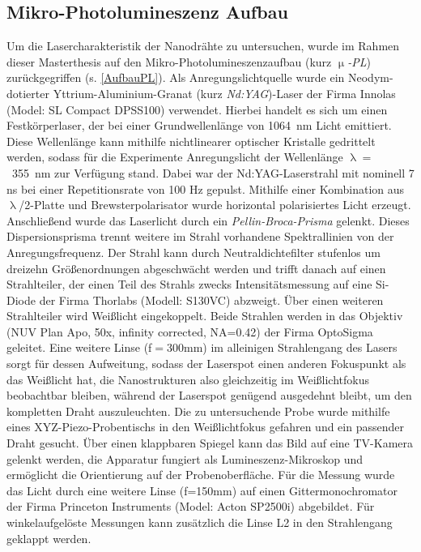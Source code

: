 \subsection{Mikro-Photolumineszenz Aufbau} Um die Lasercharakteristik der
Nanodrähte zu untersuchen, wurde im Rahmen dieser Masterthesis auf den
Mikro-Photolumineszenzaufbau (kurz \textit{$\upmu$-PL}) zurückgegriffen (s.
\autoref{AufbauPL}). Als Anregungslichtquelle wurde ein Neodym-dotierter
Yttrium-Aluminium-Granat (kurz \textit{Nd:YAG})-Laser der Firma Innolas (Model:
SL Compact DPSS100) verwendet. Hierbei handelt es sich um einen Festkörperlaser,
der bei einer Grundwellenlänge von \mbox{1064 nm} Licht emittiert. Diese
Wellenlänge kann mithilfe nichtlinearer optischer Kristalle gedrittelt werden,
sodass für die Experimente Anregungslicht der Wellenlänge \mbox{$\uplambda=$
355 nm} zur Verfügung stand. Dabei war der Nd:YAG-Laserstrahl mit nominell 7 ns
bei einer Repetitionsrate von 100 Hz gepulst. Mithilfe  einer Kombination aus
$\uplambda$/2-Platte und Brewsterpolarisator wurde horizontal polarisiertes
Licht erzeugt. Anschließend wurde das Laserlicht durch ein
\textit{Pellin-Broca-Prisma} gelenkt. Dieses Dispersionsprisma trennt weitere im
Strahl vorhandene Spektrallinien von der Anregungsfrequenz. Der Strahl kann
durch Neutraldichtefilter stufenlos um dreizehn Größenordnungen abgeschwächt
werden und trifft danach auf einen Strahlteiler, der einen Teil des Strahls
zwecks Intensitätsmessung auf eine Si-Diode der Firma Thorlabs (Modell: S130VC)
abzweigt. Über einen weiteren Strahlteiler wird Weißlicht eingekoppelt. Beide
Strahlen werden in das Objektiv (NUV Plan Apo, 50x, infinity corrected, NA=0.42)
der Firma OptoSigma geleitet. Eine weitere Linse (f$=$300mm) im alleinigen
Strahlengang des Lasers sorgt für dessen Aufweitung, sodass der Laserspot einen
anderen Fokuspunkt als das Weißlicht hat, die Nanostrukturen also gleichzeitig
im Weißlichtfokus beobachtbar bleiben, während der Laserspot genügend ausgedehnt
bleibt, um den kompletten Draht auszuleuchten. Die zu untersuchende Probe wurde
mithilfe eines XYZ-Piezo-Probentischs in den Weißlichtfokus gefahren und ein
passender Draht gesucht. Über einen klappbaren Spiegel kann das Bild auf eine
TV-Kamera gelenkt werden, die Apparatur fungiert als Lumineszenz-Mikroskop und
ermöglicht die Orientierung auf der Probenoberfläche. Für die Messung wurde das
Licht durch eine weitere Linse (f=150mm) auf einen Gittermonochromator der Firma
Princeton Instruments (Model: Acton SP2500i) abgebildet. Für winkelaufgelöste
Messungen kann zusätzlich die Linse L2 in den Strahlengang geklappt werden.
